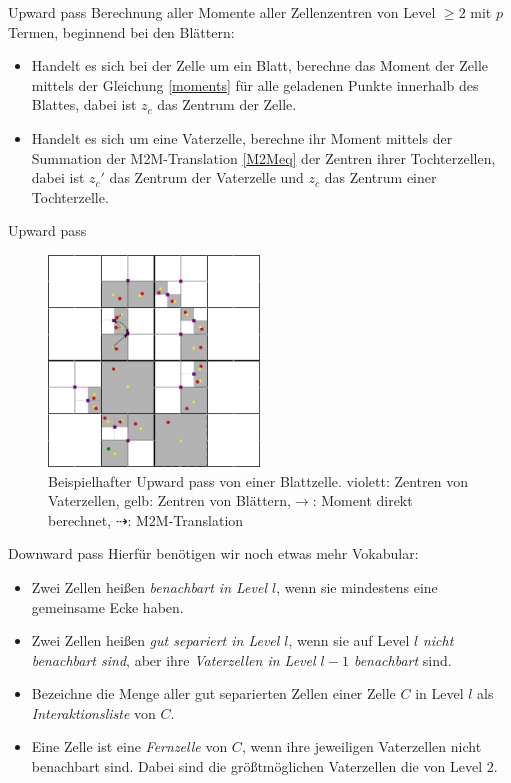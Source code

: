 \documentclass[ngerman]{beamer}
\begin{document}
\begin{frame}{Upward pass}
Berechnung aller Momente aller Zellenzentren von Level $\geq 2$ mit $p$ Termen, beginnend bei den Blättern:
\begin{itemize}
\item Handelt es sich bei der Zelle um ein Blatt, berechne das Moment der Zelle mittels der Gleichung \eqref{moments} für alle geladenen Punkte innerhalb des Blattes, dabei ist $z_c$ das Zentrum der Zelle.
\item Handelt es sich um eine Vaterzelle, berechne ihr Moment mittels der Summation der M2M-Translation \eqref{M2Meq} der Zentren ihrer Tochterzellen, dabei ist $z_c'$ das Zentrum der Vaterzelle und $z_c$ das Zentrum einer Tochterzelle.
\end{itemize}
\end{frame}

\begin{frame}{Upward pass}
\begin{figure}
\includegraphics[width=0.5\textwidth]{upward.png}
\caption{Beispielhafter Upward pass von einer Blattzelle. \linebreak violett: Zentren von Vaterzellen, gelb: Zentren von Blättern,\linebreak $\rightarrow$: Moment direkt berechnet, $\dashrightarrow$: M2M-Translation}
\end{figure}
\end{frame}

\begin{frame}{Downward pass}
Hierfür benötigen wir noch etwas mehr Vokabular:
\begin{Definition}
\begin{itemize}
\item Zwei Zellen heißen \emph{benachbart in Level $l$}, wenn sie mindestens eine gemeinsame Ecke haben.
\item Zwei Zellen heißen \emph{gut separiert in Level $l$}, wenn sie auf Level $l$ \emph{nicht benachbart sind}, aber ihre \emph{Vaterzellen in Level $l-1$ benachbart} sind.
\item Bezeichne die Menge aller gut separierten Zellen einer Zelle $C$ in Level $l$ als \emph{Interaktionsliste} von $C$.
\item Eine Zelle ist eine \emph{Fernzelle} von $C$, wenn ihre jeweiligen Vaterzellen nicht benachbart sind. Dabei sind die größtmöglichen Vaterzellen die von Level $2$.
\end{itemize}
\end{Definition}
\end{frame}
\end{document}
